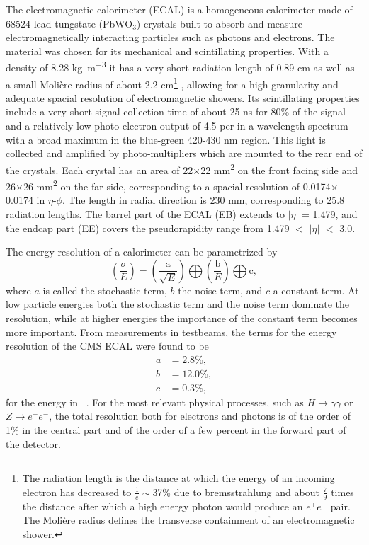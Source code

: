 The electromagnetic calorimeter (ECAL) is a homogeneous calorimeter made of \num{68524} lead tungstate (PbWO$_3$) crystals built to absorb and measure 
electromagnetically interacting particles such as photons and electrons. The material was chosen
for its mechanical and scintillating properties. With a density of 8.28 \si{\kilo\gram\per\cubic\meter} it has a very short radiation length of
0.89 \si{\centi\meter} as well as a small Moli\`{e}re radius of about 2.2 \si{\centi\meter}\footnote{The radiation length is the distance at which 
the energy of an incoming electron has decreased to $\frac{1}{e}\sim$37\% due to bremsstrahlung and about $\frac{7}{9}$ times the distance after which a high
energy photon would produce an $e^+e^-$ pair. The Moli\`{e}re radius defines the transverse containment of an electromagnetic shower.}
, allowing for a high granularity and adequate spacial resolution of electromagnetic showers. Its scintillating properties
include a very short signal collection time of about 25 \si{\nano\second} for 80\% of the signal and a relatively low photo-electron output of
4.5 per \mev in a wavelength spectrum with a broad maximum in the blue-green 420-430 \si{\nano\meter} region. This light is collected
and amplified by photo-multipliers which are mounted to the rear end of the crystals.
Each crystal has an area of 22$\times$22 \si{\square\milli\meter} on the front facing side and 26$\times$26 
\si{\square\milli\meter} on the far side, corresponding to a spacial resolution of 0.0174$\times$0.0174 in  $\eta$-$\phi$. The length 
in radial direction is 230 \si{\milli\meter}, corresponding to \num{25.8} radiation lengths. The barrel part of the ECAL (EB) extends to 
$|\eta|$ = 1.479, and the endcap part (EE) covers the pseudorapidity range from 1.479 $<$ $|\eta|$ $<$ 3.0.

The energy resolution of a calorimeter can be parametrized by
\begin{equation}
\label{eq:calo_res}
    \left( \frac{\sigma}{E} \right) =   \left( \frac{\text{a}}{\sqrt{E}} \right)   \bigoplus  \left( \frac{\text{b}}{E} \right)  \bigoplus  \text{c} ,
\end{equation}
where $a$ is called the stochastic term, $b$ the noise term, and $c$ a constant term. At low particle energies both the stochastic term and the 
noise term dominate the resolution, while at higher energies the importance of the constant term becomes more important.
From measurements in testbeams, the terms for the energy resolution of the CMS ECAL were found to be
\begin{align*}
    a &= 2.8 \%, \\
    b &= 12.0 \%, \\
    c &= 0.3 \% ,
\end{align*}
for the energy in \gev~\cite{ecalresolution}. For the most relevant physical processes, such as $H\rightarrow\gamma\gamma$ or $Z\rightarrow e^+e^-$, the total resolution
both for electrons and photons is of the order of 1\% in the central part and of the order of a few percent in the
forward part of the detector.

